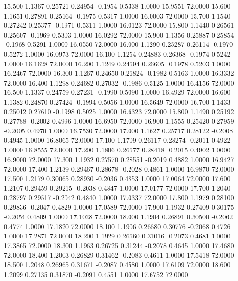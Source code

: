   15.500   1.1367   0.25721   0.24954  -0.1954   0.5338   1.0000  15.9551  72.0000
  15.600   1.1651   0.27891   0.25164  -0.1975   0.5317   1.0000  16.0003  72.0000
  15.700   1.1540   0.27242   0.25377  -0.1971   0.5311   1.0000  16.0123  72.0000
  15.800   1.1440   0.26561   0.25607  -0.1969   0.5303   1.0000  16.0292  72.0000
  15.900   1.1356   0.25887   0.25854  -0.1968   0.5291   1.0000  16.0550  72.0000
  16.000   1.1290   0.25287   0.26114  -0.1970   0.5272   1.0000  16.0973  72.0000
  16.100   1.1254   0.24883   0.26368  -0.1974   0.5242   1.0000  16.1628  72.0000
  16.200   1.1249   0.24694   0.26605  -0.1978   0.5203   1.0000  16.2467  72.0000
  16.300   1.1267   0.24650   0.26824  -0.1982   0.5163   1.0000  16.3332  72.0000
  16.400   1.1298   0.24682   0.27032  -0.1986   0.5125   1.0000  16.4156  72.0000
  16.500   1.1337   0.24759   0.27231  -0.1990   0.5090   1.0000  16.4929  72.0000
  16.600   1.1382   0.24870   0.27424  -0.1994   0.5056   1.0000  16.5649  72.0000
  16.700   1.1433   0.25012   0.27610  -0.1998   0.5025   1.0000  16.6323  72.0000
  16.800   1.1490   0.25192   0.27788  -0.2002   0.4996   1.0000  16.6950  72.0000
  16.900   1.1555   0.25420   0.27959  -0.2005   0.4970   1.0000  16.7530  72.0000
  17.000   1.1627   0.25717   0.28122  -0.2008   0.4945   1.0000  16.8065  72.0000
  17.100   1.1709   0.26117   0.28274  -0.2011   0.4922   1.0000  16.8555  72.0000
  17.200   1.1806   0.26677   0.28418  -0.2015   0.4902   1.0000  16.9000  72.0000
  17.300   1.1932   0.27570   0.28551  -0.2019   0.4882   1.0000  16.9427  72.0000
  17.400   1.2139   0.29467   0.28678  -0.2028   0.4861   1.0000  16.9870  72.0000
  17.500   1.2179   0.30065   0.28930  -0.2036   0.4853   1.0000  17.0064  72.0000
  17.600   1.2107   0.29459   0.29215  -0.2038   0.4847   1.0000  17.0177  72.0000
  17.700   1.2040   0.28797   0.29517  -0.2042   0.4840   1.0000  17.0337  72.0000
  17.800   1.1979   0.28100   0.29836  -0.2047   0.4829   1.0000  17.0589  72.0000
  17.900   1.1932   0.27409   0.30175  -0.2054   0.4809   1.0000  17.1028  72.0000
  18.000   1.1904   0.26891   0.30500  -0.2062   0.4774   1.0000  17.1820  72.0000
  18.100   1.1906   0.26680   0.30776  -0.2068   0.4726   1.0000  17.2871  72.0000
  18.200   1.1929   0.26660   0.31016  -0.2073   0.4681   1.0000  17.3865  72.0000
  18.300   1.1963   0.26725   0.31244  -0.2078   0.4645   1.0000  17.4680  72.0000
  18.400   1.2003   0.26829   0.31462  -0.2083   0.4611   1.0000  17.5418  72.0000
  18.500   1.2048   0.26965   0.31671  -0.2087   0.4580   1.0000  17.6109  72.0000
  18.600   1.2099   0.27135   0.31870  -0.2091   0.4551   1.0000  17.6752  72.0000
